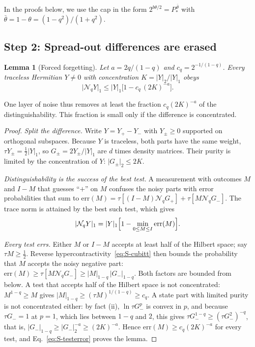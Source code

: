 \documentclass[aps,prl,twocolumn,superscriptaddress,floatfix]{revtex4-2}
\theoremstyle{plain}
\newtheorem{lemma}{Lemma}
\newcommand{\nrm}[2]{\lvert #1\rvert_{#2}}
\newcommand{\Nq}{\mathcal N_q}
\begin{document}
In the proofs below, we use the cap in the form $2^{b\theta/2}=P_*^{\,\bar\theta}$ with $\bar\theta=1-\theta=(1-q^2)/(1+q^2)$.

\subsection{Step 2: Spread-out differences are erased}
\label{sm:forget}

\begin{lemma}[Forced forgetting]\label{lem:forget}
Let $a=2q/(1-q)$ and $c_q=2^{-1/(1-q)}$. Every traceless Hermitian $Y\ne0$ with concentration $K=\nrm Y2/\nrm Y1$ obeys
\begin{equation}
\nrm{\Nq Y}1\le\nrm Y1\bigl[1-c_q\,(2K)^{-a}\bigr].
\label{eq:S-forget}
\end{equation}
\end{lemma}

One layer of noise thus removes at least the fraction $c_q(2K)^{-a}$ of the distinguishability. This fraction is small only if the difference is concentrated.

\begin{proof}
\emph{Split the difference.} Write $Y=Y_+-Y_-$ with $Y_\pm\ge0$ supported on orthogonal subspaces. Because $Y$ is traceless, both parts have the same weight, $\tau Y_\pm=\frac12\nrm Y1$, so $G_\pm=2Y_\pm/\nrm Y1$ are $d$ times density matrices. Their purity is limited by the concentration of $Y$: $\nrm{G_\pm}2\le2K$.

\emph{Distinguishability is the success of the best test.} A measurement with outcomes $M$ and $I-M$ that guesses ``$+$'' on $M$ confuses the noisy parts with error probabilities that sum to $\mathrm{err}(M)=\tau[(I-M)\Nq G_+]+\tau[M\Nq G_-]$. The trace norm is attained by the best such test, which gives
\begin{equation}
\nrm{\Nq Y}1=\nrm Y1\Bigl[1-\min_{0\le M\le I}\mathrm{err}(M)\Bigr].
\label{eq:S-testerror}
\end{equation}

\emph{Every test errs.} Either $M$ or $I-M$ accepts at least half of the Hilbert space; say $\tau M\ge\frac12$. Reverse hypercontractivity~\eqref{eq:S-cubitt} then bounds the probability that $M$ accepts the noisy negative part: $\mathrm{err}(M)\ge\tau[M\Nq G_-]\ge\nrm M{1-q}\,\nrm{G_-}{1-q}$. Both factors are bounded from below. A test that accepts half of the Hilbert space is not concentrated: $M^{1-q}\ge M$ gives $\nrm M{1-q}\ge(\tau M)^{1/(1-q)}\ge c_q$. A state part with limited purity is not concentrated either: by fact (ii), $\ln\tau G_-^p$ is convex in $p$, and because $\tau G_-=1$ at $p=1$, which lies between $1-q$ and $2$, this gives $\tau G_-^{1-q}\ge(\tau G_-^2)^{-q}$, that is, $\nrm{G_-}{1-q}\ge\nrm{G_-}2^{-a}\ge(2K)^{-a}$. Hence $\mathrm{err}(M)\ge c_q(2K)^{-a}$ for every test, and Eq.~\eqref{eq:S-testerror} proves the lemma.
\end{proof}
\end{document}

